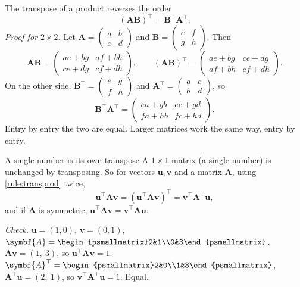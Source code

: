 \documentclass[11pt,a4paper,oneside,openany]{book}
\newcommand{\B}[1]{{\symbf{#1}}}
\newcommand{\B}[1]{{\bm{#1}}}
\newcommand{\T}{^{\top}}
\newcommand{\vu}{\B{u}}
\newcommand{\vv}{\B{v}}
\newcommand{\mA}{\B{A}}
\newcommand{\mB}{\B{B}}
\begin{document}
\begin{rulebox}[label=rule:transprod]{The transpose of a product reverses the order}
\[
  (\mA\mB)\T=\mB\T\mA\T .
\]
\emph{Proof for $2\times2$.} Let $\mA=\begin{pmatrix}a&b\\c&d\end{pmatrix}$ and $\mB=\begin{pmatrix}e&f\\g&h\end{pmatrix}$. Then
\[
  \mA\mB=\begin{pmatrix}ae+bg&af+bh\\ce+dg&cf+dh\end{pmatrix},\qquad
  (\mA\mB)\T=\begin{pmatrix}ae+bg&ce+dg\\af+bh&cf+dh\end{pmatrix}.
\]
On the other side, $\mB\T=\begin{pmatrix}e&g\\f&h\end{pmatrix}$ and $\mA\T=\begin{pmatrix}a&c\\b&d\end{pmatrix}$, so
\[
  \mB\T\mA\T=\begin{pmatrix}ea+gb&ec+gd\\fa+hb&fc+hd\end{pmatrix}.
\]
Entry by entry the two are equal. Larger matrices work the same way, entry by entry.
\end{rulebox}

\begin{rulebox}[label=rule:scalarT]{A single number is its own transpose}
A $1\times1$ matrix (a single number) is unchanged by transposing. So for vectors $\vu,\vv$ and a matrix $\mA$, using
\cref{rule:transprod} twice,
\[
  \vu\T\mA\vv=(\vu\T\mA\vv)\T=\vv\T\mA\T\vu,
\]
and if $\mA$ is symmetric, $\vu\T\mA\vv=\vv\T\mA\vu$.

\emph{Check.} $\vu=(1,0)$, $\vv=(0,1)$, $\mA=\begin{psmallmatrix}2&1\\0&3\end{psmallmatrix}$. $\mA\vv=(1,\ 3)$, so
$\vu\T\mA\vv=1$. $\mA\T=\begin{psmallmatrix}2&0\\1&3\end{psmallmatrix}$, $\mA\T\vu=(2,\ 1)$, so $\vv\T\mA\T\vu=1$. Equal.
\end{rulebox}
\end{document}
